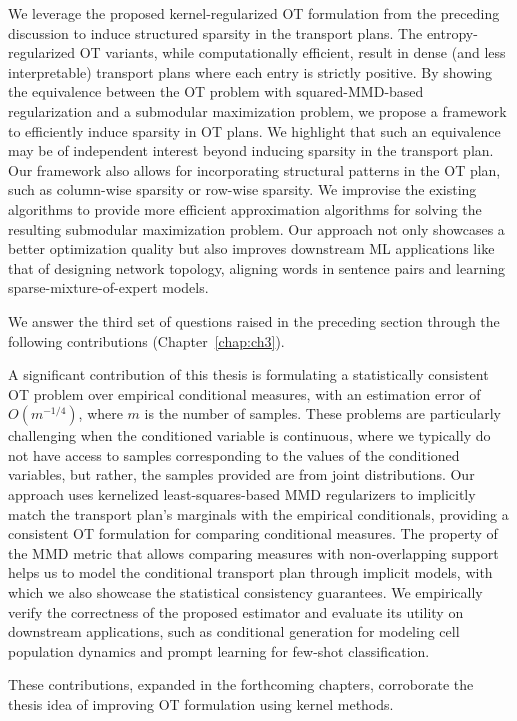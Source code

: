 We leverage the proposed kernel-regularized OT formulation from the preceding discussion to induce structured sparsity in the transport plans. The entropy-regularized OT variants, while computationally efficient, result in dense (and less interpretable) transport plans where each entry is strictly positive. By showing the equivalence between the OT problem with squared-MMD-based regularization and a submodular maximization problem, we propose a framework to efficiently induce sparsity in OT plans. We highlight that such an equivalence may be of independent interest beyond inducing sparsity in the transport plan. Our framework also allows for incorporating structural patterns in the OT plan, such as column-wise sparsity or row-wise sparsity. We improvise the existing algorithms to provide more efficient approximation algorithms for solving the resulting submodular maximization problem. Our approach not only showcases a better optimization quality but also improves downstream ML applications like that of designing network topology, aligning words in sentence pairs and learning sparse-mixture-of-expert models.

We answer the third set of questions raised in the preceding section through the following contributions (Chapter~\ref{chap:ch3}).

A significant contribution of this thesis is formulating a statistically consistent OT problem over empirical conditional measures, with an estimation error of $O(m^{-1/4})$, where $m$ is the number of samples. These problems are particularly challenging when the conditioned variable is continuous, where we typically do not have access to samples corresponding to the values of the conditioned variables, but rather, the samples provided are from joint distributions. Our approach uses kernelized least-squares-based MMD regularizers to implicitly match the transport plan’s marginals with the empirical conditionals, providing a consistent OT formulation for comparing conditional measures. The property of the MMD metric that allows comparing measures with non-overlapping support helps us to model the conditional transport plan through implicit models, with which we also showcase the statistical consistency guarantees. We empirically verify the correctness of the proposed estimator and evaluate its utility on downstream applications, such as conditional generation for modeling cell population dynamics and prompt learning for few-shot classification.

These contributions, expanded in the forthcoming chapters, corroborate the thesis idea of improving OT formulation using kernel methods.
